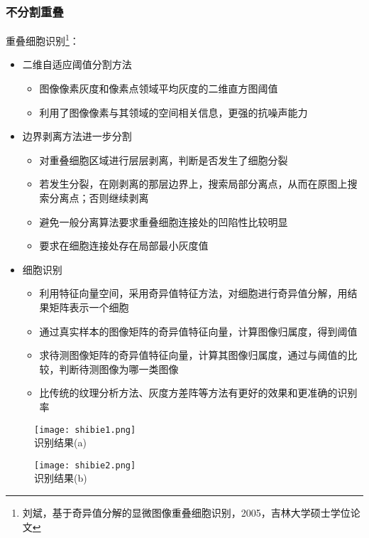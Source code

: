 \documentclass[notheorems,mathserif,table,compress]{beamer}  %
\begin{document}
\begin{frame}
    \frametitle{不分割重叠}
   重叠细胞识别\footnote{刘斌，基于奇异值分解的显微图像重叠细胞识别，2005，吉林大学硕士学位论文}：\\
   \begin{itemize}
       \item 二维自适应阈值分割方法
        \begin{itemize}
	   \item 图像像素灰度和像素点领域平均灰度的二维直方图阈值
	   \item 利用了图像像素与其领域的空间相关信息，更强的抗噪声能力
	\end{itemize}
       \item 边界剥离方法进一步分割
	\begin{itemize}
	   \item 对重叠细胞区域进行层层剥离，判断是否发生了细胞分裂
	   \item 若发生分裂，在刚剥离的那层边界上，搜索局部分离点，从而在原图上搜索分离点；否则继续剥离
	   \item 避免一般分离算法要求重叠细胞连接处的凹陷性比较明显
	   \item 要求在细胞连接处存在局部最小灰度值
	\end{itemize}
    \end{itemize}
\end{frame}

\begin{frame}
   \begin{itemize}
	\item 细胞识别
	\begin{itemize}
	    \item 利用特征向量空间，采用奇异值特征方法，对细胞进行奇异值分解，用结果矩阵表示一个细胞
   	    \item 通过真实样本的图像矩阵的奇异值特征向量，计算图像归属度，得到阈值
	    \item 求待测图像矩阵的奇异值特征向量，计算其图像归属度，通过与阈值的比较，判断待测图像为哪一类图像
	    \item 比传统的纹理分析方法、灰度方差阵等方法有更好的效果和更准确的识别率
	\end{itemize}
   \end{itemize}
   \begin{figure}
     \begin{minipage}[b]{0.4\textwidth} 
     \centering 
     \texttt{[image: shibie1.png]} \\
     识别结果(a)
   \end{minipage}
   \begin{minipage}[b]{0.4\textwidth} 
     \centering 
     \texttt{[image: shibie2.png]} \\
     识别结果(b)
   \end{minipage}
   \end{figure}
\end{frame}
\end{document}

